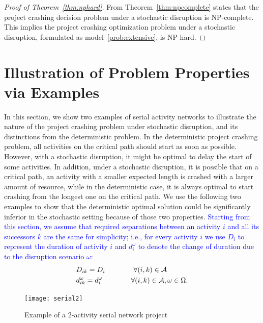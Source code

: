 \documentclass[11pt]{article}
\newcommand{\cA}{{\cal A}}
\newcommand{\noi}{\noindent}
\newcommand{\tcb}{\textcolor{blue}}
\begin{document}
	\begin{proof}[Proof of Theorem~\ref{thm:nphard}]
		From Theorem~\ref{thm:npcomplete} states that the project crashing decision problem under a stochastic disruption is NP-complete. This implies the project crashing optimization problem under a stochastic disruption, formulated as model~\ref{prob:extensive}, is NP-hard.
	\end{proof}
	
\section{Illustration of Problem Properties via Examples} \label{sec:examples}
	In this section, we show two examples of serial activity networks to illustrate the nature of the project crashing problem under stochastic disruption, and its distinctions from the deterministic problem. In the deterministic project crashing problem, all activities on the critical path should start as soon as possible. However, with a stochastic disruption, it might be optimal to delay the start of some activities. In addition, under a stochastic disruption, it is possible that on a critical path, an activity with a smaller expected length is crashed with a larger amount of resource, while in the deterministic case, it is always optimal to start crashing from the longest one on the critical path. We use the following two examples to show that the deterministic optimal solution could be significantly inferior in the stochastic setting because of those two properties. \tcb{Starting from this section, we assume that required separations between an activity \(i\) and all its successors \(k\) are the same for simplicity; i.e., for every activity \(i\) we use \(D_i\) to represent the duration of activity \(i\) and \(d_i^\omega\) to denote the change of duration due to the disruption scenario \(\omega\):
	\begin{align*}
		& D_{ik} = D_i \qquad \qquad \forall (i,k) \in \cA\\
		& d^{\omega}_{ik} = d^{\omega}_i \qquad \qquad \forall (i,k) \in \cA, \omega \in \Omega.
	\end{align*}}
	\begin{figure}[H]
		\centering
		\texttt{[image: serial2]}
		\caption{Example of a 2-activity serial network project}
		\label{fig:serial2}
	\end{figure}
\end{document}
